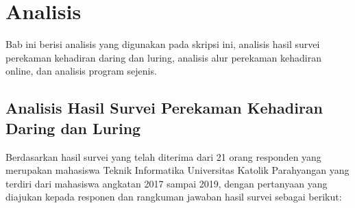 \chapter{Analisis}
\label{chap:analisis}
Bab ini berisi analisis yang digunakan pada skripsi ini, analisis hasil survei perekaman kehadiran daring dan luring, analisis alur perekaman kehadiran online, dan analisis program sejenis.

\section{Analisis Hasil Survei Perekaman Kehadiran Daring dan Luring}
\label{sec:survei} 
Berdasarkan hasil survei yang telah diterima dari 21 orang responden yang merupakan mahasiswa Teknik Informatika Universitas Katolik
Parahyangan yang terdiri dari mahasiswa angkatan 2017 sampai 2019, dengan pertanyaan yang diajukan kepada responen dan rangkuman jawaban hasil survei sebagai berikut:
